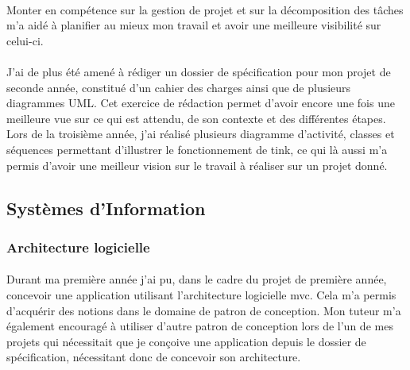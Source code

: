 \documentclass[12pt,a4paper]{report}
\begin{document}
\paragraph*{}Monter en compétence sur la gestion de projet et sur la décomposition des tâches m'a aidé à planifier au mieux mon travail et avoir une meilleure visibilité sur celui-ci.
\paragraph*{}J'ai de plus été amené à rédiger un dossier de spécification pour mon projet de seconde année, constitué d'un cahier des charges ainsi que de plusieurs diagrammes UML. Cet exercice de rédaction permet d'avoir encore une fois une meilleure vue sur ce qui est attendu, de son contexte et des différentes étapes. Lors de la troisième année, j'ai réalisé plusieurs diagramme d'activité, classes et séquences permettant d'illustrer le fonctionnement de \gls{tink}, ce qui là aussi m'a permis d'avoir une meilleur vision sur le travail à réaliser sur un projet donné.\\

\subsection{Systèmes d'Information}
\subsubsection{Architecture logicielle}
\paragraph*{}Durant ma première année j’ai pu, dans le cadre du projet de première année, concevoir une application utilisant l’architecture logicielle \gls{mvc}. Cela m’a permis d'acquérir des notions dans le domaine de patron de conception. Mon tuteur m’a également encouragé à utiliser d'autre patron de conception lors de l’un de mes projets qui nécessitait que je conçoive une application depuis le dossier de spécification, nécessitant donc de concevoir son architecture.
\end{document}
